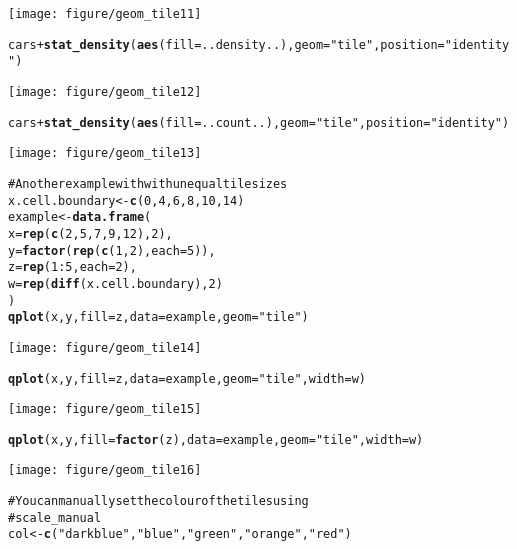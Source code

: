 \documentclass[a4paper,titlepage]{tufte-handout}\usepackage{graphicx, color}
\makeatletter
\def\maxwidth{ %
  \ifdim\Gin@nat@width>\linewidth
    \linewidth
  \else
    \Gin@nat@width
  \fi
}
\newcommand{\hlfunctioncall}[1]{\textcolor[rgb]{0.501960784313725,0,0.329411764705882}{\textbf{#1}}}%
\newcommand{\hlstring}[1]{\textcolor[rgb]{0.6,0.6,1}{#1}}%
\newcommand{\hlcomment}[1]{\textcolor[rgb]{0.180392156862745,0.6,0.341176470588235}{#1}}%
\newenvironment{kframe}{%
 \def\at@end@of@kframe{}%
 \ifinner\ifhmode%
  \def\at@end@of@kframe{\end{minipage}}%
  \begin{minipage}{\columnwidth}%
 \fi\fi%
 \def\FrameCommand##1{\hskip\@totalleftmargin \hskip-\fboxsep
 \colorbox{shadecolor}{##1}\hskip-\fboxsep
     \hskip-\linewidth \hskip-\@totalleftmargin \hskip\columnwidth}%
 \MakeFramed {\advance\hsize-\width
   \@totalleftmargin\z@ \linewidth\hsize
   \@setminipage}}%
 {\par\unskip\endMakeFramed%
 \at@end@of@kframe}
\newenvironment{knitrout}{}{} %
\makeatother
\begin{document}
\begin{knitrout}
\begin{kframe}
\end{kframe}\texttt{[image: figure/geom\_tile11]} \begin{kframe}\begin{alltt}
cars + \hlfunctioncall{stat_density}(\hlfunctioncall{aes}(fill=..density..), geom=\hlstring{"tile"}, position=\hlstring{"identity"})
\end{alltt}
\end{kframe}\texttt{[image: figure/geom\_tile12]} \begin{kframe}\begin{alltt}
cars + \hlfunctioncall{stat_density}(\hlfunctioncall{aes}(fill=..count..), geom=\hlstring{"tile"}, position=\hlstring{"identity"})
\end{alltt}
\end{kframe}\texttt{[image: figure/geom\_tile13]} \begin{kframe}\begin{alltt}
\hlcomment{# Another example with with unequal tile sizes}
x.cell.boundary <- \hlfunctioncall{c}(0, 4, 6, 8, 10, 14)
example <- \hlfunctioncall{data.frame}(
  x = \hlfunctioncall{rep}(\hlfunctioncall{c}(2, 5, 7, 9, 12), 2),
  y = \hlfunctioncall{factor}(\hlfunctioncall{rep}(\hlfunctioncall{c}(1,2), each=5)),
  z = \hlfunctioncall{rep}(1:5, each=2),
  w = \hlfunctioncall{rep}(\hlfunctioncall{diff}(x.cell.boundary), 2)
)
\hlfunctioncall{qplot}(x, y, fill=z, data=example, geom=\hlstring{"tile"})
\end{alltt}
\end{kframe}\texttt{[image: figure/geom\_tile14]} \begin{kframe}\begin{alltt}
\hlfunctioncall{qplot}(x, y, fill=z, data=example, geom=\hlstring{"tile"}, width=w)
\end{alltt}
\end{kframe}\texttt{[image: figure/geom\_tile15]} \begin{kframe}\begin{alltt}
\hlfunctioncall{qplot}(x, y, fill=\hlfunctioncall{factor}(z), data=example, geom=\hlstring{"tile"}, width=w)
\end{alltt}
\end{kframe}\texttt{[image: figure/geom\_tile16]} \begin{kframe}\begin{alltt}
\hlcomment{# You can manually set the colour of the tiles using}
\hlcomment{# scale_manual}
col <- \hlfunctioncall{c}(\hlstring{"darkblue"}, \hlstring{"blue"}, \hlstring{"green"}, \hlstring{"orange"}, \hlstring{"red"})

\end{alltt}
\end{kframe}
\end{knitrout}
\end{document}
